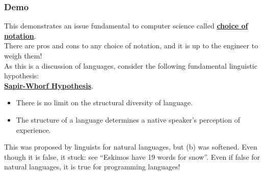 \begin{frame}
\frametitle{Demo}
\noindent This demonstrates an issue fundamental to computer science called \textbf{\underline{choice of notation}}.\\
There are pros and cons to any choice of notation, and it is up to the engineer to weigh them!\\
As this is a discussion of languages, consider the following fundamental linguistic hypothesis:\\
\textbf{\underline{Sapir-Whorf Hypothesis}}. \begin{itemize}
\item There is no limit on the structural diversity of language.
\item The structure of a language determines a native speaker's perception of experience.
\end{itemize}
This was proposed by linguists for natural languages, but (b) was softened. Even though it is false, it stuck: see “Eskimos have 19 words for snow”. Even if false for natural languages,  it is true for programming languages!
\end{frame}
